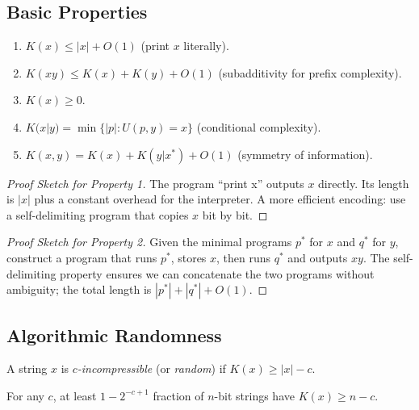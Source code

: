 \subsection{Basic Properties}
\label{sec:kolmogorov:properties}

\begin{theorem}
\label{thm:kolmogorov:basic}
\begin{enumerate}
\item $K(x) \le |x| + O(1)$ (print $x$ literally).
\item $K(xy) \le K(x) + K(y) + O(1)$ (subadditivity for prefix complexity).
\item $K(x) \ge 0$.
\item $K(x|y) = \min \{ |p| : U(p,y) = x \}$ (conditional complexity).
\item $K(x,y) = K(x) + K(y|x^*) + O(1)$ (symmetry of information).
\end{enumerate}
\end{theorem}

\begin{proof}[Proof Sketch for Property 1]
The program ``print x'' outputs $x$ directly. Its length is $|x|$ plus a constant overhead for the interpreter. A more efficient encoding: use a self-delimiting program that copies $x$ bit by bit.
\end{proof}

\begin{proof}[Proof Sketch for Property 2]
Given the minimal programs $p^*$ for $x$ and $q^*$ for $y$, construct a program that runs $p^*$, stores $x$, then runs $q^*$ and outputs $xy$. The self-delimiting property ensures we can concatenate the two programs without ambiguity; the total length is $|p^*| + |q^*| + O(1)$.
\end{proof}

\subsection{Algorithmic Randomness}
\label{sec:kolmogorov:randomness}

\begin{definition}
A string $x$ is \emph{$c$-incompressible} (or \emph{random}) if $K(x) \ge |x| - c$.
\end{definition}

\begin{theorem}
\label{thm:most_random}
For any $c$, at least $1 - 2^{-c+1}$ fraction of $n$-bit strings have $K(x) \ge n - c$.
\end{theorem}

